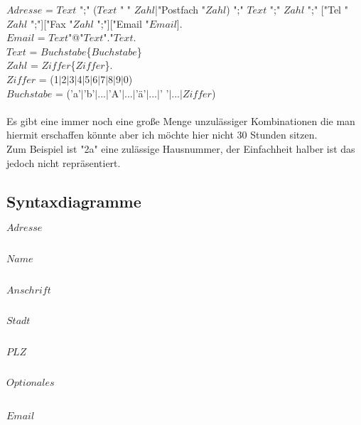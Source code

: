 \documentclass[11pt]{article} %
\begin{document}
$Adresse$ = $Text$ ";" ($Text$ " " $Zahl$|"Postfach "$Zahl$) ";" $Text$ ";" $Zahl$ ";" ["Tel "$Zahl$ ";"]["Fax "$Zahl$ ";"]["Email "$Email$].\\
$Email$ = $Text$"@"$Text$"."$Text$.\\
$Text$ = $Buchstabe$\{$Buchstabe$\}\\
$Zahl$ = $Ziffer$\{$Ziffer$\}.\\
$Ziffer$ = (1$|$2$|$3$|$4$|$5$|$6$|$7$|$8$|$9$|$0)\\
$Buchstabe$ = ('a'$|$'b'$|$...$|$'A'$|$...$|$'ä'$|$...$|$'  '$|$...$|Ziffer$)
\\\\
Es gibt eine immer noch eine große Menge unzulässiger Kombinationen die man hiermit erschaffen könnte aber ich möchte hier nicht 30 Stunden sitzen.\\
Zum Beispiel ist "2a" eine zulässige Hausnummer, der Einfachheit halber ist das jedoch nicht repräsentiert.

\subsection{Syntaxdiagramme}

$Adresse$\\
\begin{Syntaxdiagramm}%
\end{Syntaxdiagramm}
\\
$Name$\\
\begin{Syntaxdiagramm}%
\end{Syntaxdiagramm}
\\
$Anschrift$\\
\begin{Syntaxdiagramm}%
	\Alternative
		{
		}
		{
		}
\end{Syntaxdiagramm}
\\
$Stadt$\\
\begin{Syntaxdiagramm}%
\end{Syntaxdiagramm}
\\
$PLZ$\\
\begin{Syntaxdiagramm}%
\end{Syntaxdiagramm}
\\
$Optionales$\\
\begin{Syntaxdiagramm}%
	\Alternative
	{}
	{\PfeilR}
	\Alternative
	{}
	{\PfeilR}
	\Alternative
	{}
	{\PfeilR}
\end{Syntaxdiagramm}
\\
$Email$\\
\begin{Syntaxdiagramm}%
\end{Syntaxdiagramm}
\end{document}
